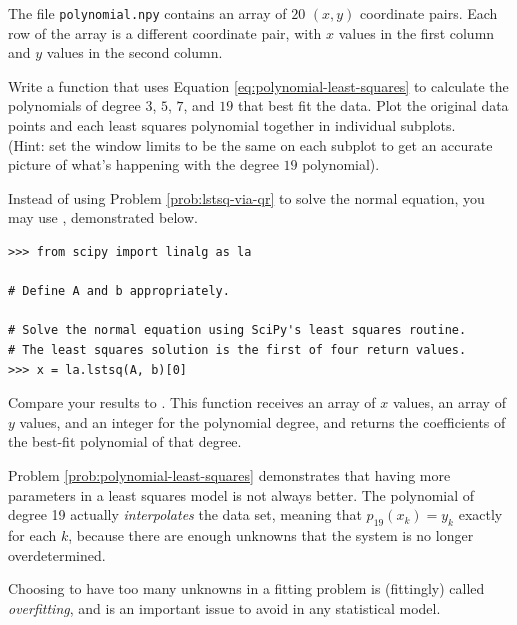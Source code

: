 \begin{problem} %
The file \texttt{polynomial.npy} contains an array of $20$ $(x,y)$ coordinate pairs.
Each row of the array is a different coordinate pair, with $x$ values in the first column and $y$ values in the second column.

Write a function that uses Equation \ref{eq:polynomial-least-squares} to calculate the polynomials of degree $3$, $5$, $7$, and $19$ that best fit the data.
Plot the original data points and each least squares polynomial together in individual subplots.\\
(Hint: set the window limits to be the same on each subplot to get an accurate picture of what's happening with the degree $19$ polynomial).

Instead of using Problem \ref{prob:lstsq-via-qr} to solve the normal equation, you may use , demonstrated below.

\begin{lstlisting}
>>> from scipy import linalg as la

# Define A and b appropriately.

# Solve the normal equation using SciPy's least squares routine.
# The least squares solution is the first of four return values.
>>> x = la.lstsq(A, b)[0]
\end{lstlisting}

Compare your results to .
This function receives an array of $x$ values, an array of $y$ values, and an integer for the polynomial degree, and returns the coefficients of the best-fit polynomial of that degree.

\label{prob:polynomial-least-squares}
\end{problem}

\begin{warn} %
Problem \ref{prob:polynomial-least-squares} demonstrates that having more parameters in a least squares model is not always better.
The polynomial of degree 19 actually \emph{interpolates} the data set, meaning that $p_{19}(x_k) = y_k$ exactly for each $k$, because there are enough unknowns that the system is no longer overdetermined.

Choosing to have too many unknowns in a fitting problem is (fittingly) called \emph{overfitting}, and is an important issue to avoid in any statistical model.
\end{warn}

